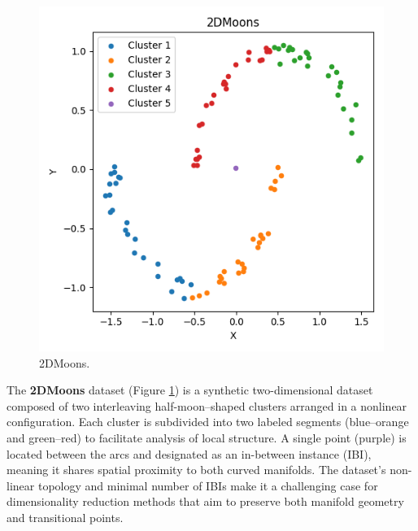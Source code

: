 \begin{figure}
    \centering
    \includegraphics[width=\myimgwidth]{images/datasets/2DMoons.png}
    \caption{2DMoons.}
    \label{fig:2DMoons}
\end{figure}
The \textbf{2DMoons} dataset (Figure \ref{fig:2DMoons}) is a synthetic two-dimensional dataset composed of two interleaving half-moon–shaped clusters arranged in a nonlinear configuration. Each cluster is subdivided into two labeled segments (blue–orange and green–red) to facilitate analysis of local structure. A single point (purple) is located between the arcs and designated as an in-between instance (IBI), meaning it shares spatial proximity to both curved manifolds. The dataset’s non-linear topology and minimal number of IBIs make it a challenging case for dimensionality reduction methods that aim to preserve both manifold geometry and transitional points.
\newline


